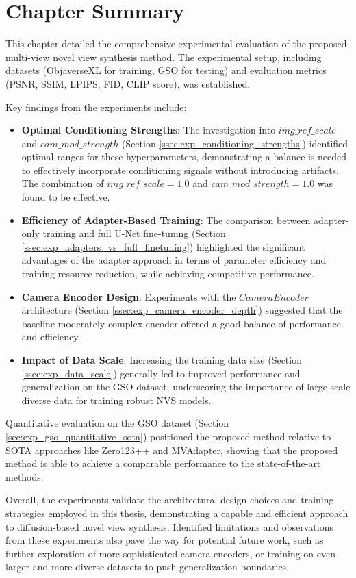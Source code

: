 \section{Chapter Summary}\label{sec:exp_summary}
This chapter detailed the comprehensive experimental evaluation of the proposed multi-view novel view synthesis method. The experimental setup, including datasets (ObjaverseXL for training, GSO for testing) and evaluation metrics (PSNR, SSIM, LPIPS, FID, CLIP score), was established.

Key findings from the experiments include:
\begin{itemize}
  \item \textbf{Optimal Conditioning Strengths}: The investigation into $img\_ref\_scale$ and $cam\_mod\_strength$ (Section \ref{ssec:exp_conditioning_strengths}) identified optimal ranges for these hyperparameters, demonstrating a balance is needed to effectively incorporate conditioning signals without introducing artifacts. The combination of $img\_ref\_scale=1.0$ and $cam\_mod\_strength=1.0$ was found to be effective.
  \item \textbf{Efficiency of Adapter-Based Training}: The comparison between adapter-only training and full U-Net fine-tuning (Section \ref{ssec:exp_adapters_vs_full_finetuning}) highlighted the significant advantages of the adapter approach in terms of parameter efficiency and training resource reduction, while achieving competitive performance.
  \item \textbf{Camera Encoder Design}: Experiments with the $CameraEncoder$ architecture (Section \ref{ssec:exp_camera_encoder_depth}) suggested that the baseline moderately complex encoder offered a good balance of performance and efficiency.
  \item \textbf{Impact of Data Scale}: Increasing the training data size (Section \ref{ssec:exp_data_scale}) generally led to improved performance and generalization on the GSO dataset, underscoring the importance of large-scale diverse data for training robust NVS models.
\end{itemize}

Quantitative evaluation on the GSO dataset (Section \ref{sec:exp_gso_quantitative_sota}) positioned the proposed method relative to SOTA approaches like Zero123++ and MVAdapter, showing that the proposed method is able to achieve a comparable performance to the state-of-the-art methods. 

Overall, the experiments validate the architectural design choices and training strategies employed in this thesis, demonstrating a capable and efficient approach to diffusion-based novel view synthesis. Identified limitations and observations from these experiments also pave the way for potential future work, such as further exploration of more sophisticated camera encoders, or training on even larger and more diverse datasets to push generalization boundaries.